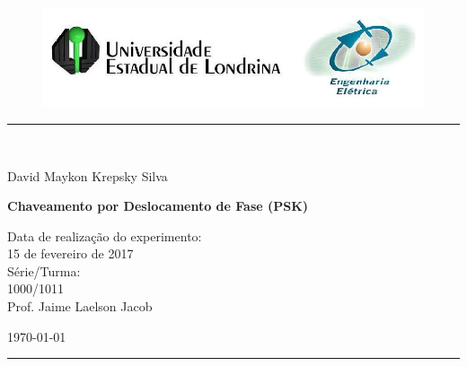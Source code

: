 \begin{titlepage}
\begin{center}
\begin{figure}[h]
\includegraphics[scale=0.76]{img/topdotitulo.png}
\end{figure}
\rule{\columnwidth}{1.5mm}
\

\large David Maykon Krepsky Silva


\vspace{4cm}
{\bf \Large Chaveamento por Deslocamento de Fase (PSK)}
\vspace{3.5cm}

\begin{flushright}
Data de realização do experimento:\\
15 de fevereiro de 2017\\
Série/Turma:\\
1000/1011\\
Prof. Jaime Laelson Jacob
\end{flushright}

\vspace{3.2cm}
\today

\rule{\columnwidth}{1.3mm}
\end{center}
\end{titlepage}